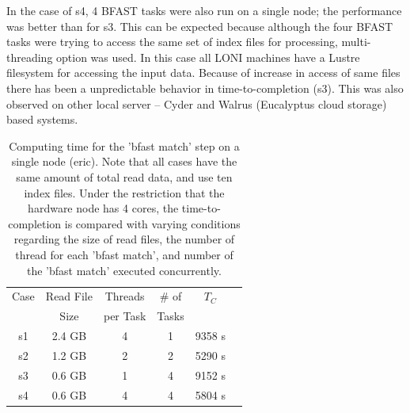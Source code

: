 \documentclass{cpeauth}
\begin{document}

In the case of s4, 4 BFAST tasks were also run on a single node; the
performance was better than for s3. This can be expected because
although the four BFAST tasks were trying to access the same set of
index files for processing, multi-threading option was used.  In this
case all LONI machines have a Lustre filesystem for accessing the
input data.  Because of increase in access of same files there has
been a unpredictable behavior in time-to-completion (s3). This was
also observed on other local server -- Cyder and Walrus (Eucalyptus
cloud storage) based systems.






 \begin{table}
 \small
 \begin{tabular}{|c|c|c|c|c|c|} 
 \hline 
Case & Read File  & Threads & \# of   & $T_C$ \\
& Size &  per Task &  Tasks &   \\  \hline
s1 & 2.4 GB &  4 & 1 & 9358 s \\
s2 & 1.2 GB & 2 & 2 & 5290 s \\
s3 & 0.6 GB & 1 & 4 & 9152 s \\ 
s4& 0.6 GB & 4 & 4 & 5804 s \\

 \hline
 \end{tabular}
 
 \caption{Computing time for the 'bfast match' step on a single node
   (eric). Note that all cases have the same amount of total read
   data, and use ten index files.  Under the restriction that the
   hardware node has 4 cores, the time-to-completion is compared with
   varying conditions regarding the size of read files, the number of
   thread for each 'bfast match', and number of the 'bfast match'
   executed concurrently.  }
    \label{table:understandio}
\end{table}
\end{document}

